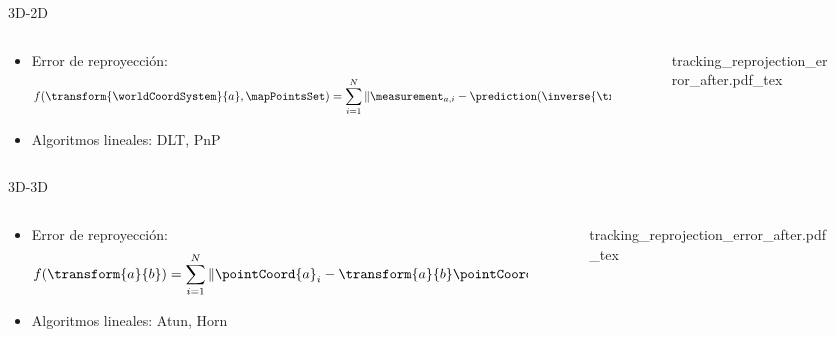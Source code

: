 \begin{frame}
	3D-2D
    \begin{columns}
	\begin{column}{0.7\textwidth}
		\begin{itemize}
			\item Error de reproyección:
			\[
			f(\transform{\worldCoordSystem}{a}, \mapPointsSet)= \sum_{i=1}^{N} \Vert \measurement_{a,i} - \prediction(\inverse{\transform{\worldCoordSystem}{a}},\worldPoint_{i}) \Vert^{2}
			\]
			\item Algoritmos lineales: DLT, PnP
		\end{itemize}
	\end{column}
	\begin{column}{0.3\textwidth}
		\begin{figure}
			\def\svgwidth{\columnwidth}
			{tracking_reprojection_error_after.pdf_tex}
		\end{figure}
	\end{column}
	\end{columns}
	3D-3D
	\begin{columns}
		\begin{column}{0.7\textwidth}
			\begin{itemize}
				\item Error de reproyección:
				\[
				f(\transform{a}{b})= \sum_{i=1}^{N} \Vert \pointCoord{a}_{i} - \transform{a}{b} \pointCoord{b}_{i} \Vert^{2}
				\]
				\item Algoritmos lineales: Atun, Horn
			\end{itemize}
		\end{column}
		\begin{column}{0.3\textwidth}
			\begin{figure}
				\def\svgwidth{\columnwidth}
				{tracking_reprojection_error_after.pdf_tex}
			\end{figure}
		\end{column}
	\end{columns}

\end{frame}

